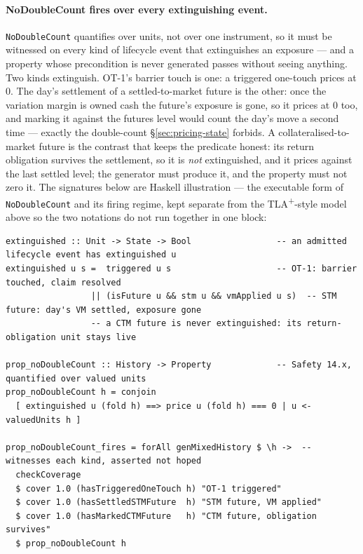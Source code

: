 \paragraph{NoDoubleCount fires over every extinguishing event.}
\texttt{NoDoubleCount} quantifies over units, not over one instrument, so it must be witnessed
on every kind of lifecycle event that extinguishes an exposure --- and a property whose
precondition is never generated passes without seeing anything. Two kinds extinguish. OT-1's
barrier touch is one: a triggered one-touch prices at $0$. The day's settlement of a
settled-to-market future is the other: once the variation margin is owned cash the future's
exposure is gone, so it prices at $0$ too, and marking it against the futures level would count
the day's move a second time --- exactly the double-count \S\ref{sec:pricing-state} forbids. A
collateralised-to-market future is the contrast that keeps the predicate honest: its return
obligation survives the settlement, so it is \emph{not} extinguished, and it prices against the
last settled level; the generator must produce it, and the property must not zero it. The
signatures below are Haskell illustration --- the executable form of \texttt{NoDoubleCount} and
its firing regime, kept separate from the TLA\textsuperscript{+}-style model above so the two
notations do not run together in one block:

\begin{lstlisting}
extinguished :: Unit -> State -> Bool                 -- an admitted lifecycle event has extinguished u
extinguished u s =  triggered u s                     -- OT-1: barrier touched, claim resolved
                 || (isFuture u && stm u && vmApplied u s)  -- STM future: day's VM settled, exposure gone
                 -- a CTM future is never extinguished: its return-obligation unit stays live

prop_noDoubleCount :: History -> Property             -- Safety 14.x, quantified over valued units
prop_noDoubleCount h = conjoin
  [ extinguished u (fold h) ==> price u (fold h) === 0 | u <- valuedUnits h ]

prop_noDoubleCount_fires = forAll genMixedHistory $ \h ->  -- witnesses each kind, asserted not hoped
  checkCoverage
  $ cover 1.0 (hasTriggeredOneTouch h) "OT-1 triggered"
  $ cover 1.0 (hasSettledSTMFuture  h) "STM future, VM applied"
  $ cover 1.0 (hasMarkedCTMFuture   h) "CTM future, obligation survives"
  $ prop_noDoubleCount h
\end{lstlisting}

